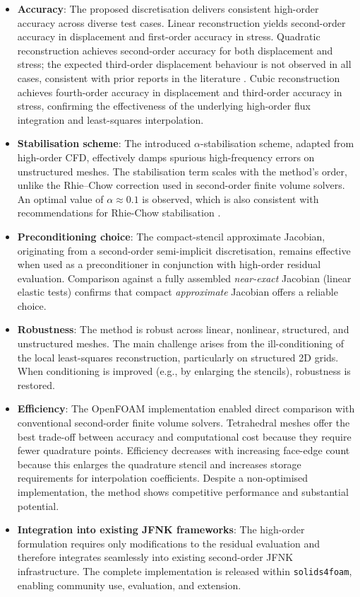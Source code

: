 \documentclass[review,3p]{elsarticle}
\begin{document}
\begin{itemize}
	\item \textbf{Accuracy}: The proposed discretisation delivers consistent high-order accuracy across diverse test cases. Linear reconstruction yields second-order accuracy in displacement and first-order accuracy in stress. Quadratic reconstruction achieves second-order accuracy for both displacement and stress; the expected third-order displacement behaviour is not observed in all cases, consistent with prior reports in the literature \cite{Nishikawa2025a}. Cubic reconstruction achieves fourth-order accuracy in displacement and third-order accuracy in stress, confirming the effectiveness of the underlying high-order flux integration and least-squares interpolation.
	\item \textbf{Stabilisation scheme}: The introduced $\alpha$-stabilisation scheme, adapted from high-order CFD, effectively damps spurious high-frequency errors on unstructured meshes. The stabilisation term scales with the method's order, unlike the Rhie–Chow correction used in second-order finite volume solvers. An optimal value of $\alpha \approx 0.1$ is observed, which is also consistent with recommendations for Rhie-Chow stabilisation \cite{Cardiff2026}.
	\item \textbf{Preconditioning choice}: The compact-stencil approximate Jacobian, originating from a second-order semi-implicit discretisation, remains effective when used as a preconditioner in conjunction with high-order residual evaluation. Comparison against a fully assembled \emph{near-exact} Jacobian (linear elastic tests) confirms that compact \emph{approximate} Jacobian offers a reliable choice.
	\item \textbf{Robustness}:
	The method is robust across linear, nonlinear, structured, and unstructured meshes. The main challenge arises from the ill-conditioning of the local least-squares reconstruction, particularly on structured 2D grids. When conditioning is improved (e.g., by enlarging the stencils), robustness is restored.
	\item \textbf{Efficiency}: The OpenFOAM implementation enabled direct comparison with conventional second-order finite volume solvers. Tetrahedral meshes offer the best trade-off between accuracy and computational cost because they require fewer quadrature points. Efficiency decreases with increasing face-edge count because this enlarges the quadrature stencil and increases storage requirements for interpolation coefficients. Despite a non-optimised implementation, the method shows competitive performance and substantial potential.
	\item \textbf{Integration into existing JFNK frameworks}: The high-order formulation requires only modifications to the residual evaluation and therefore integrates seamlessly into existing second-order JFNK infrastructure. The complete implementation is released within \texttt{solids4foam}, enabling community use, evaluation, and extension.
\end{itemize}
\end{document}
